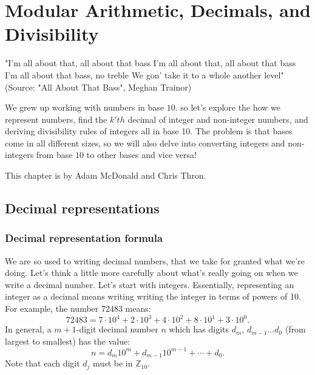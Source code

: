 \chapter{Modular Arithmetic, Decimals, and Divisibility}\label{bases}
"I'm all about that, all about that bass
I'm all about that, all about that bass
I'm all about that bass, no treble
We gon' take it to a whole another level"
(Source: "All About That Bass", Meghan Trainor)

We grew up working with numbers in base $10$. so let's explore the how we represent numbers, find the $k'th$ decimal of integer and non-integer numbers,  and deriving divisibility rules of integers all in base 10. The problem is that bases come in all different sizes, so we will also delve into converting integers and non-integers from base $10$ to other bases and vice versa!  

This chapter is by Adam McDonald and Chris Thron.

\section{Decimal representations}
\label{sec:decimalReps}


\subsection{Decimal representation formula}
We are so used to writing decimal numbers, that we take for granted what we're doing.  Let's think a little more carefully about what's really going on when we write a decimal number. Let's start with integers. 
Essentially, representing an integer as a decimal   means writing writing the integer in terms of powers of 10.  For example, the number 72483 means:
\begin{equation}
72483=7\cdot 10^{4}+2 \cdot 10^{3}+ 4 \cdot 10^2 + 8 \cdot 10^1 + 3 \cdot 10^0.
\end{equation}
In general, a $m+1$-digit decimal number $n$ which has digits $d_m$, $d_{m-1} \ldots d_0$ (from largest to smallest) has the value:
\begin{equation}
n=d_{m}10^{m}+d_{m-1}10^{m-1}+\cdots+d_{0}. 
\end{equation} 
Note that each digit $d_j$ must be in $\mathbb{Z}_{10}$.

